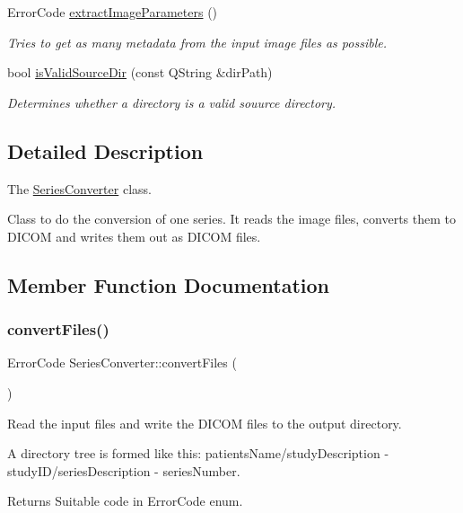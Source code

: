\begin{DoxyCompactItemize}
Error\+Code \hyperlink{class_series_converter_af4bcee40f249309b5b153fc951196ddb}{extract\+Image\+Parameters} ()
\begin{DoxyCompactList}\small\item\em Tries to get as many metadata from the input image files as possible. \end{DoxyCompactList}\item 
bool \hyperlink{class_series_converter_a88356a78d84c2d3aba7f4a340c4202ed}{is\+Valid\+Source\+Dir} (const Q\+String \&dir\+Path)
\begin{DoxyCompactList}\small\item\em Determines whether a directory is a valid souurce directory. \end{DoxyCompactList}\end{DoxyCompactItemize}


\subsection{Detailed Description}
The \hyperlink{class_series_converter}{Series\+Converter} class. 

Class to do the conversion of one series. It reads the image files, converts them to D\+I\+C\+OM and writes them out as D\+I\+C\+OM files. 

\subsection{Member Function Documentation}
\mbox{\label{class_series_converter_ac8729b482ee4eda39bd6a9e710f4449c}} 
\subsubsection{\texorpdfstring{convert\+Files()}{convertFiles()}}
{\footnotesize\ttfamily Error\+Code Series\+Converter\+::convert\+Files (\begin{DoxyParamCaption}{ }\end{DoxyParamCaption})}



Read the input files and write the D\+I\+C\+OM files to the output directory. 

A directory tree is formed like this\+: patients\+Name/study\+Description -\/ study\+I\+D/series\+Description -\/ series\+Number. \begin{DoxyReturn}{Returns}
Suitable code in Error\+Code enum. 
\end{DoxyReturn}
\mbox{\label{class_series_converter_af4bcee40f249309b5b153fc951196ddb}} 
